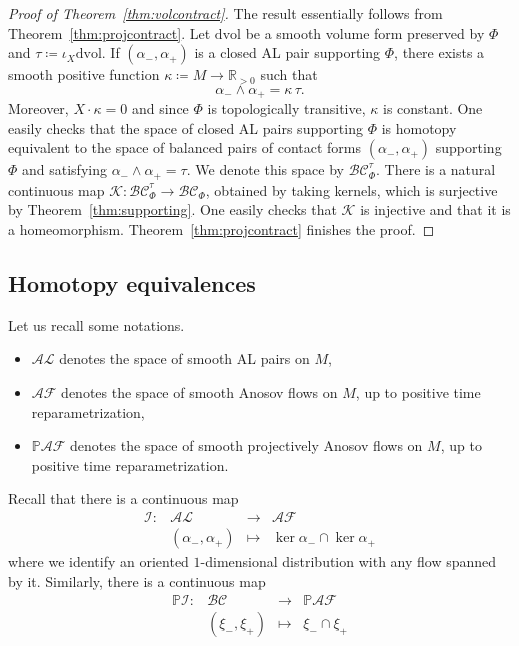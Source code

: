 \documentclass[letterpaper, 11pt]{article}
\numberwithin{equation}{section}
\newcommand{\R}{\mathbb{R}}
\begin{document}
\begin{proof}[Proof of Theorem~\ref{thm:volcontract}] The result essentially follows from Theorem~\ref{thm:projcontract}. Let $\mathrm{dvol}$ be a smooth volume form preserved by $\Phi$ and $\tau \coloneqq \iota_X \mathrm{dvol}$. If $(\alpha_-, \alpha_+)$ is a closed AL pair supporting $\Phi$, there exists a smooth positive function $\kappa \coloneqq M \rightarrow \R_{>0}$ such that $$\alpha_- \wedge \alpha_+ = \kappa \, \tau.$$ Moreover, $X \cdot \kappa = 0$ and since $\Phi$ is topologically transitive, $\kappa$ is constant. One easily checks that the space of closed AL pairs supporting $\Phi$ is homotopy equivalent to the space of balanced pairs of contact forms $(\alpha_-, \alpha_+)$ supporting $\Phi$ and satisfying $\alpha_- \wedge \alpha_+ = \tau$. We denote this space by $\mathcal{BC}^\tau_\Phi$. There is a natural continuous map $\mathcal{K} : \mathcal{BC}^\tau_\Phi \rightarrow \mathcal{BC}_\Phi$, obtained by taking kernels, which is surjective by Theorem~\ref{thm:supporting}. One easily checks that $\mathcal{K}$ is injective and that it is a homeomorphism. Theorem~\ref{thm:projcontract} finishes the proof.
\end{proof}

		\subsection{Homotopy equivalences}

Let us recall some notations.
\begin{itemize}
\item $\mathcal{AL}$ denotes the space of smooth AL pairs on $M$,
\item $\mathcal{AF}$ denotes the space of smooth Anosov flows on $M$, up to positive time reparametrization,
\item $\mathbb{P} \mathcal{AF}$ denotes the space of smooth projectively Anosov flows on $M$,  up to positive time reparametrization.
\end{itemize}

Recall that there is a continuous map
$$
\begin{array}{rccc}
\mathcal{I} : & \mathcal{AL} & \longrightarrow & \mathcal{AF} \\
		   & (\alpha_-, \alpha_+) & \longmapsto & \ker \alpha_- \cap \ker \alpha_+
\end{array} $$
where we identify an oriented $1$-dimensional distribution with any flow spanned by it. Similarly, there is a continuous map
$$
\begin{array}{rccc}
\mathbb{P}\mathcal{I} : & \mathcal{BC} & \longrightarrow & \mathbb{P}\mathcal{AF} \\
		   & (\xi_-, \xi_+) & \longmapsto & \xi_- \cap \xi_+
\end{array} $$
\end{document}
